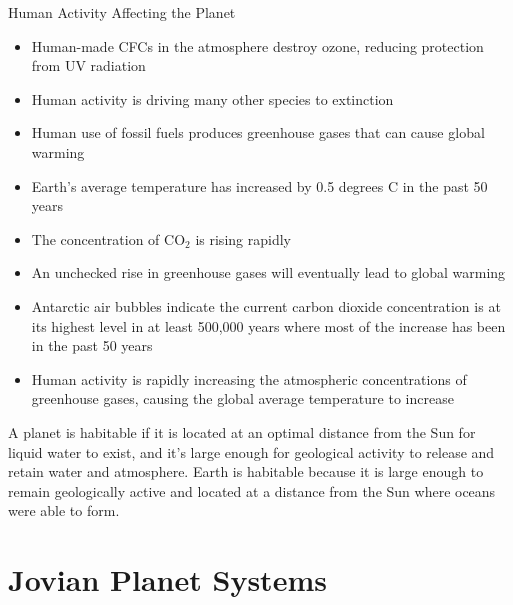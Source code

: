 \documentclass[12pt]{article}
\begin{document}
Human Activity Affecting the Planet \begin{itemize} 
\item Human-made CFCs in the atmosphere destroy ozone, reducing protection from UV radiation
\item Human activity is driving many other species to extinction
\item Human use of fossil fuels produces greenhouse gases that can cause global warming
\item Earth's average temperature has increased by 0.5 degrees C in the past 50 years
\item The concentration of CO$_2$ is rising rapidly
\item An unchecked rise in greenhouse gases will eventually lead to global warming
\item Antarctic air bubbles indicate the current carbon dioxide concentration is at its highest level in at least 500,000 years where most of the increase has been in the past 50 years
\item Human activity is rapidly increasing the atmospheric concentrations of greenhouse gases, causing the global average temperature to increase \end{itemize} 
A planet is habitable if it is located at an optimal distance from the Sun for liquid water to exist, and it's large enough for geological activity to release and retain water and atmosphere. Earth is habitable because it is large enough to remain geologically active and located at a distance from the Sun where oceans were able to form. 

\section{Jovian Planet Systems} 
\end{document}
